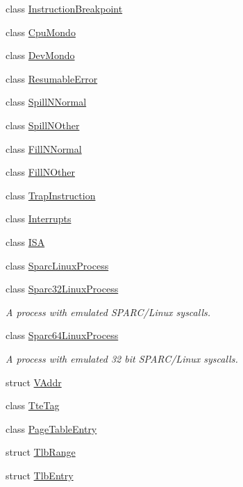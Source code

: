 \begin{DoxyCompactItemize}
class \hyperlink{classSparcISA_1_1InstructionBreakpoint}{InstructionBreakpoint}
\item 
class \hyperlink{classSparcISA_1_1CpuMondo}{CpuMondo}
\item 
class \hyperlink{classSparcISA_1_1DevMondo}{DevMondo}
\item 
class \hyperlink{classSparcISA_1_1ResumableError}{ResumableError}
\item 
class \hyperlink{classSparcISA_1_1SpillNNormal}{SpillNNormal}
\item 
class \hyperlink{classSparcISA_1_1SpillNOther}{SpillNOther}
\item 
class \hyperlink{classSparcISA_1_1FillNNormal}{FillNNormal}
\item 
class \hyperlink{classSparcISA_1_1FillNOther}{FillNOther}
\item 
class \hyperlink{classSparcISA_1_1TrapInstruction}{TrapInstruction}
\item 
class \hyperlink{classSparcISA_1_1Interrupts}{Interrupts}
\item 
class \hyperlink{classSparcISA_1_1ISA}{ISA}
\item 
class \hyperlink{classSparcISA_1_1SparcLinuxProcess}{SparcLinuxProcess}
\item 
class \hyperlink{classSparcISA_1_1Sparc32LinuxProcess}{Sparc32LinuxProcess}
\begin{DoxyCompactList}\small\item\em A process with emulated SPARC/Linux syscalls. \item\end{DoxyCompactList}\item 
class \hyperlink{classSparcISA_1_1Sparc64LinuxProcess}{Sparc64LinuxProcess}
\begin{DoxyCompactList}\small\item\em A process with emulated 32 bit SPARC/Linux syscalls. \item\end{DoxyCompactList}\item 
struct \hyperlink{structSparcISA_1_1VAddr}{VAddr}
\item 
class \hyperlink{classSparcISA_1_1TteTag}{TteTag}
\item 
class \hyperlink{classSparcISA_1_1PageTableEntry}{PageTableEntry}
\item 
struct \hyperlink{structSparcISA_1_1TlbRange}{TlbRange}
\item 
struct \hyperlink{structSparcISA_1_1TlbEntry}{TlbEntry}
\item 

\end{DoxyCompactItemize}

